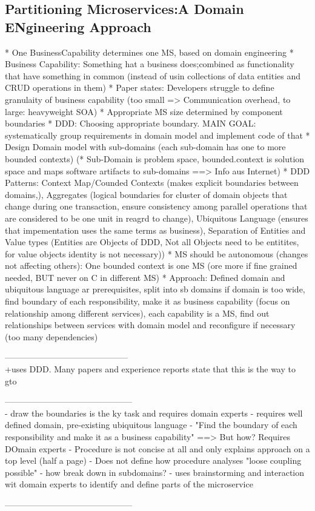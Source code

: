 \subsection{Partitioning Microservices:A Domain ENgineering Approach}

* One BusinessCapability determines one MS, based on domain engineering
* Business Capability: Something hat a business does;combined as functionality that have something in common (instead of usin collections of data entities and CRUD operations in them)
* Paper states: Developers struggle to define granulaity of business capability (too small => Communication overhead, to large: heavyweight SOA)
* Appropriate MS size determined by component boundaries
* DDD: Choosing appropriate boundary. MAIN GOAL: systematically group requirements in domain model and implement code  of that
* Design Domain model with sub-domains (each sub-domain has one to more bounded contexts)
(* Sub-Domain is problem space, bounded.context is solution space and maps software artifacts to sub-domains ==> Info aus Internet)
* DDD Patterns: Context Map/Counded Contexts (makes explicit boundaries between domains,), Aggregates (logical boundaries for cluster of domain objects that change during one transaction, ensure consistency among parallel operations that are considered to be one unit in reagrd to change), Ubiquitous Language (ensures that impementation uses the same terms as business), Separation of Entities and Value types (Entities are Objects of DDD, Not all Objects need to be entitites, for value objects identity is not necessary))
* MS should be autonomous (changes not affecting others): One bounded context is one MS (ore more if fine grained needed, BUT never on C in different MS)
* Approach: Defined domain and ubiquitous language ar prerequisites, split into sb domains if domain is too wide, find boundary of each responsibility, make it as business capability (focus on relationship among different services), each capability is a MS, find out relationships between services with domain model and reconfigure if necessary (too many dependencies)


--------------------------------------------\\


+uses DDD. Many papers and experience reports state that this is the way to gto


---------------------------------------------\\

- draw the boundaries is the ky task and requires domain experts
- requires well defined domain, pre-existing ubiquitous language
- "Find the boundary of each responsibility and make it as a business capability" ==> But how? Requires DOmain experts
- Procedure is not concise at all and only explains approach on a top level (half a page)
- Does not define how procedure analyses "loose coupling possible"
- how break down in subdomains?
- uses brainstorming and interaction wit domain experts to identify and define parts of the microservice


---------------------------------------------\\



